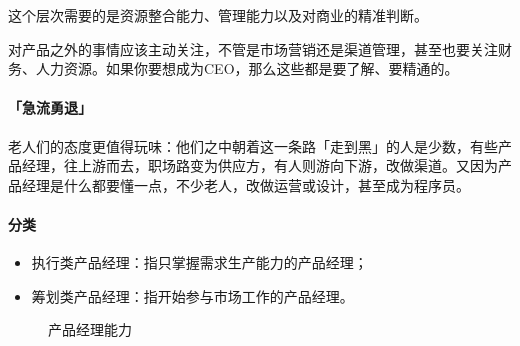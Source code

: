 \documentclass[letterpaper,11pt,english]{sphinxmanual}
\let\sphinxpxdimen\pdfpxdimen\else\newdimen\sphinxpxdimen
\begin{document}
这个层次需要的是资源整合能力、管理能力以及对商业的精准判断。

对产品之外的事情应该主动关注，不管是市场营销还是渠道管理，甚至也要关注财务、人力资源。如果你要想成为CEO，那么这些都是要了解、要精通的。
%
\begin{footnote}[604]\sphinxAtStartFootnote
{}
%
\end{footnote}

\begin{center}\end{center} 


\paragraph{「急流勇退」}
\label{\detokenize{chapter_experience/career_path:id14}}
老人们的态度更值得玩味：他们之中朝着这一条路「走到黑」的人是少数，有些产品经理，往上游而去，职场路变为供应方，有人则游向下游，改做渠道。又因为产品经理是什么都要懂一点，不少老人，改做运营或设计，甚至成为程序员。%
\begin{footnote}[605]\sphinxAtStartFootnote
{}
%
\end{footnote}


\paragraph{分类}
\label{\detokenize{chapter_experience/career_path:id15}}\begin{itemize}
\item {} 
执行类产品经理：指只掌握需求生产能力的产品经理；

\item {} 
筹划类产品经理：指开始参与市场工作的产品经理。

\end{itemize}

\begin{figure}[H]
\centering
\capstart

\noindent\sphinxincludegraphics[width=400\sphinxpxdimen]{{PM_class}.png}
\caption{产品经理能力\sphinxfootnotemark[606]}\label{\detokenize{chapter_experience/career_path:id27}}\end{figure}
%
\begin{footnotetext}[606]\sphinxAtStartFootnote
{}
%
\end{footnotetext}\ignorespaces 
{}
\end{document}
